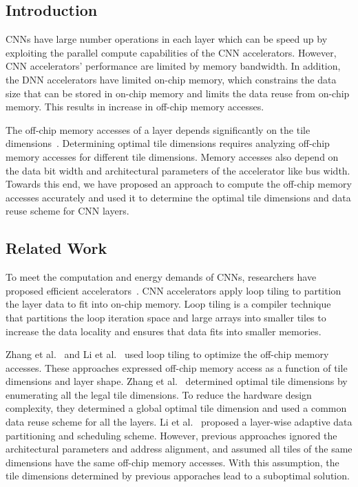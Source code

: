\documentclass[a4paper,10pt]{article}
\begin{document}
\subsection{Introduction}
CNNs have large number operations in each layer which can be speed up by exploiting the parallel compute capabilities of the CNN accelerators. However, CNN accelerators' performance are limited by memory bandwidth. In addition, the DNN accelerators have limited on-chip memory, which constrains the data size that can be stored in on-chip memory and limits the data reuse from on-chip memory. This results in increase in off-chip memory accesses. 

The off-chip memory accesses of a layer depends significantly on the tile dimensions~\cite{zhang2015optimizing, Li2018SmartShuttleOO}. Determining optimal tile dimensions requires analyzing off-chip memory accesses for different tile dimensions. Memory accesses also depend on the data bit width and architectural parameters of the accelerator like bus width. Towards this end, we have proposed an approach to compute the off-chip memory accesses accurately and used it to determine the optimal tile dimensions and data reuse scheme for CNN layers.
\subsection{Related Work}
To meet the computation and energy demands of CNNs, researchers have proposed efficient accelerators~\cite{gokhale2014240,8742284,alwani2016fused, Chen2016EyerissAS}. CNN accelerators apply loop tiling to partition the layer data to fit into on-chip memory. Loop tiling is a compiler  technique~\cite{aho2006compilers} that partitions the loop iteration space and large arrays into smaller tiles to increase the data locality and ensures that data fits into smaller memories. 

Zhang et al.~\cite{zhang2015optimizing} and Li et al.~\cite{Li2018SmartShuttleOO} used loop tiling to optimize the off-chip memory accesses. These approaches expressed off-chip memory access as a function of tile dimensions and layer shape. Zhang et al.~\cite{zhang2015optimizing} determined optimal tile dimensions by enumerating all the legal tile dimensions. To reduce the hardware design complexity, they determined a global optimal tile dimension and used a common data reuse scheme for all the layers. Li et al.~\cite{Li2018SmartShuttleOO} proposed a layer-wise adaptive data partitioning and scheduling scheme. However, previous approaches ignored the architectural parameters and address alignment, and assumed all tiles of the same dimensions have the same off-chip memory accesses. With this assumption, the tile dimensions determined by previous apporaches lead to a suboptimal solution.
\end{document}
